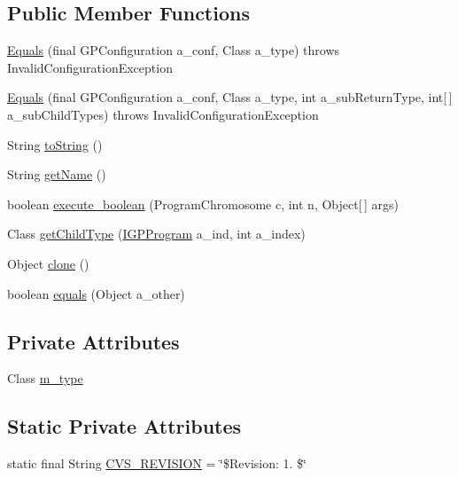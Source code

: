 \subsection*{Public Member Functions}
\begin{DoxyCompactItemize}
\item 
\hyperlink{classorg_1_1jgap_1_1gp_1_1function_1_1_equals_a024b5aad38551b066ad92a3fc581e4a8}{Equals} (final G\-P\-Configuration a\-\_\-conf, Class a\-\_\-type)  throws Invalid\-Configuration\-Exception 
\item 
\hyperlink{classorg_1_1jgap_1_1gp_1_1function_1_1_equals_a3454f14f36adfd055ea1e713be5b2b99}{Equals} (final G\-P\-Configuration a\-\_\-conf, Class a\-\_\-type, int a\-\_\-sub\-Return\-Type, int\mbox{[}$\,$\mbox{]} a\-\_\-sub\-Child\-Types)  throws Invalid\-Configuration\-Exception 
\item 
String \hyperlink{classorg_1_1jgap_1_1gp_1_1function_1_1_equals_a2b2faceecc7e8645edf35380315afe95}{to\-String} ()
\item 
String \hyperlink{classorg_1_1jgap_1_1gp_1_1function_1_1_equals_a5f324812b20ed96f6f13aa938cefee78}{get\-Name} ()
\item 
boolean \hyperlink{classorg_1_1jgap_1_1gp_1_1function_1_1_equals_ac511e8424ec57394366c2bf631eca7fd}{execute\-\_\-boolean} (Program\-Chromosome c, int n, Object\mbox{[}$\,$\mbox{]} args)
\item 
Class \hyperlink{classorg_1_1jgap_1_1gp_1_1function_1_1_equals_ad255a85d218a08a75ba0c5bd959df83a}{get\-Child\-Type} (\hyperlink{interfaceorg_1_1jgap_1_1gp_1_1_i_g_p_program}{I\-G\-P\-Program} a\-\_\-ind, int a\-\_\-index)
\item 
Object \hyperlink{classorg_1_1jgap_1_1gp_1_1function_1_1_equals_ae8f02c772c21d750cbf45489e5188afd}{clone} ()
\item 
boolean \hyperlink{classorg_1_1jgap_1_1gp_1_1function_1_1_equals_add3045d0c35ed9d86f023021ebf368f5}{equals} (Object a\-\_\-other)
\end{DoxyCompactItemize}
\subsection*{Private Attributes}
\begin{DoxyCompactItemize}
\item 
Class \hyperlink{classorg_1_1jgap_1_1gp_1_1function_1_1_equals_ad705940d646ddd7bdd330916933b7329}{m\-\_\-type}
\end{DoxyCompactItemize}
\subsection*{Static Private Attributes}
\begin{DoxyCompactItemize}
\item 
static final String \hyperlink{classorg_1_1jgap_1_1gp_1_1function_1_1_equals_a6f5b4992bd3328361e584b2574e6faa1}{C\-V\-S\-\_\-\-R\-E\-V\-I\-S\-I\-O\-N} = \char`\"{}\$Revision\-: 1. \$\char`\"{}
\end{DoxyCompactItemize}
